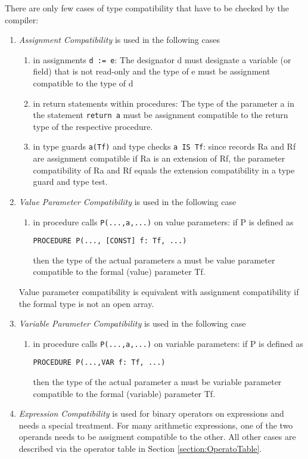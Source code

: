 \documentclass[a4wide,11pt]{article}
\begin{document}
There are only few cases of type compatibility that have to be checked by the compiler:
\begin{enumerate}
\item \emph{Assignment Compatibility} is used in the following cases
\begin{enumerate}
\item in assignments \lstinline"d := e": The designator d must designate a variable (or field) that is not read-only and the type of e must be assignment compatible to the type of d
\item in return statements within procedures: The type of the parameter a in the statement \lstinline"return a" must be assignment compatible to the return type of the respective procedure.
\item in type guards \lstinline"a(Tf)" and type checks \lstinline"a IS Tf": since records Ra and Rf are assignment compatible if Ra is an extension of Rf, the parameter compatibility of Ra and Rf equals the extension compatibility in a type guard and type test.
\end{enumerate}
\item \emph{Value Parameter Compatibility} is used in the following case
\begin{enumerate}
\item in procedure calls \lstinline"P(...,a,...)" on value parameters: if P is defined as
\begin{lstlisting}
PROCEDURE P(..., [CONST] f: Tf, ...)
\end{lstlisting}
then the type of the actual parameters a must be value parameter compatible to the formal (value) parameter Tf.
\end{enumerate}
Value parameter compatibility is equivalent with assignment compatibility if the formal type is not an open array.
\item \emph{Variable Parameter Compatibility} is used in the following case
\begin{enumerate}
\item in procedure calls \lstinline"P(...,a,...)" on variable parameters: if P is defined as
\begin{lstlisting}
PROCEDURE P(...,VAR f: Tf, ...)
\end{lstlisting}
then the type of the actual parameter a must be variable parameter compatible to the formal (variable) parameter Tf.
\end{enumerate}

\item \emph{Expression Compatibility} is used for binary operators on expressions and needs a special treatment.
For many arithmetic expressions, one of the two operands needs to be assigment compatible to the other.
All other cases are described via the operator table in Section \ref{section:OperatoTable}.
\end{enumerate}
\end{document}
